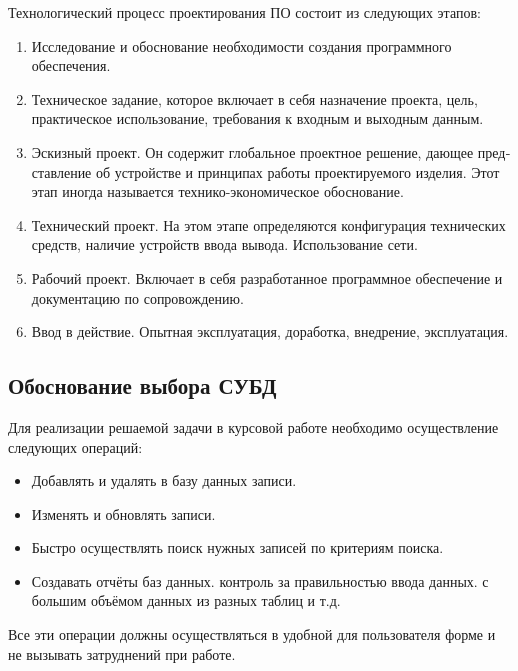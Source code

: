 \documentclass[a4paper, 12pt, titlepage]{article}
\begin{document}
\begin{otherlanguage}{russian}
\par Технологический процесс проектирования ПО состоит из следующих этапов:\\
\begin{enumerate}
\item Исследование и обоснование необходимости создания программного обеспечения.
\item Техническое задание, которое включает в себя назначение проекта, цель, практическое использование, требования к входным и выходным данным.
\item Эскизный проект. Он содержит глобальное проектное решение, дающее представление об устройстве и принципах работы проектируемого изделия. Этот этап иногда называется технико-экономическое обоснование.
\item Технический проект. На этом этапе определяются конфигурация технических средств, наличие устройств ввода вывода. Использование сети.
\item Рабочий проект. Включает в себя разработанное программное обеспечение и документацию по сопровождению.
\item Ввод в действие. Опытная эксплуатация, доработка, внедрение, эксплуатация.
\end{enumerate}

\newpage

\subsection{Обоснование выбора СУБД}
\vspace{15mm}

\par Для реализации решаемой задачи в курсовой работе необходимо осуществление следующих операций:\\
\begin{itemize}
\item Добавлять и удалять в базу данных записи.
\item Изменять и обновлять записи.
\item Быстро осуществлять поиск нужных записей по критериям поиска.
\item Создавать отчёты баз данных.
 контроль за правильностью ввода данных.
 с большим объёмом данных из разных таблиц и т.д. 
\end{itemize}

\par Все эти операции должны осуществляться в удобной для пользователя форме и не вызывать затруднений при работе. \\


\end{otherlanguage}
\end{document}

